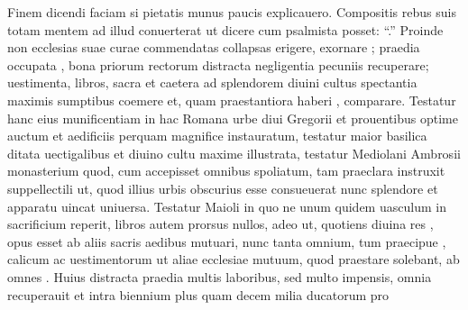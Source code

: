 \documentclass[a5paper,twoside]{article}
\begin{document}
\begin{pages}
\begin{Leftside}
Finem dicendi faciam si   pietatis munus paucis explicauero.  Compositis rebus suis totam mentem ad illud conuerterat ut dicere cum psalmista  posset: ``.''  Proinde non  ecclesias suae curae commendatas collapsas erigere, exornare ; praedia occupata , bona priorum rectorum distracta negligentia  pecuniis recuperare; uestimenta, libros,  sacra et caetera ad splendorem diuini cultus spectantia maximis sumptibus coemere et, quam praestantiora haberi , comparare.  Testatur hanc eius munificentiam in hac Romana urbe diui Gregorii  et prouentibus optime auctum et aedificiis perquam magnifice instauratum, testatur  maior basilica  ditata uectigalibus et diuino cultu maxime illustrata, testatur Mediolani Ambrosii monasterium quod, cum accepisset omnibus  spoliatum, tam praeclara instruxit suppellectili ut, quod   illius urbis obscurius esse consueuerat nunc splendore et  apparatu uincat uniuersa. Testatur  Maioli  in quo ne unum quidem uasculum in sacrificium reperit, libros autem prorsus nullos, adeo ut, quotiens diuina res , opus esset ab aliis sacris aedibus  mutuari, nunc tanta  omnium, tum praecipue , calicum ac uestimentorum  ut aliae ecclesiae mutuum, quod praestare solebant, ab  omnes .  Huius   distracta praedia multis laboribus, sed multo  impensis, omnia recuperauit et intra biennium plus quam decem milia ducatorum pro 
\end{Leftside}
\end{pages}
\end{document}
